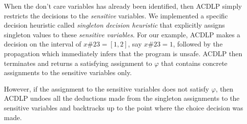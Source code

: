When the don't care variables has already been identified, then ACDLP simply 
restricts the decisions to the {\em sensitive} variables.  We implemented a 
specific decision heuristic called {\em singleton decision heuristic} that 
explicitly assigns singleton values to these {\em sensitive variables}.  
For our example, ACDLP makes a decision 
on the interval of $x\#23 = [1,2]$, say $x\#23=1$, followed by the propagation 
which immediately infers that the program is unsafe.  ACDLP then terminates
and returns a satisfying assignment to $\varphi$ that contains concrete 
assignments to the sensitive variables only.

However, if the assignment to the sensitive variables does not satisfy 
$\varphi$, then ACDLP undoes all the deductions made from the singleton 
assignments to the sensitive variables and backtracks up to the point where 
the choice decision was made. 


